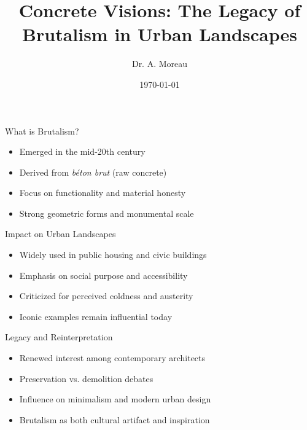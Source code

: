\documentclass{beamer}
\title{Concrete Visions: The Legacy of Brutalism in Urban Landscapes}
\author{Dr. A. Moreau}
\institute{Jeanneret Architecture Forum}
\date{\today}
\begin{document}
\frame{\titlepage}

\begin{frame}{What is Brutalism?}
\begin{itemize}
    \item Emerged in the mid-20th century
    \item Derived from \textit{béton brut} (raw concrete)
    \item Focus on functionality and material honesty
    \item Strong geometric forms and monumental scale
\end{itemize}
\end{frame}

\begin{frame}{Impact on Urban Landscapes}
\begin{itemize}
    \item Widely used in public housing and civic buildings
    \item Emphasis on social purpose and accessibility
    \item Criticized for perceived coldness and austerity
    \item Iconic examples remain influential today
\end{itemize}
\end{frame}

\begin{frame}{Legacy and Reinterpretation}
\begin{itemize}
    \item Renewed interest among contemporary architects
    \item Preservation vs. demolition debates
    \item Influence on minimalism and modern urban design
    \item Brutalism as both cultural artifact and inspiration
\end{itemize}
\end{frame}
\end{document}
